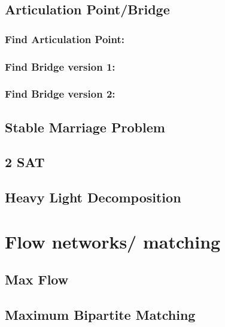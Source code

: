 \documentclass[11pt]{report}
\begin{document}
\section{Articulation Point/Bridge}
\subsection{Find Articulation Point:}

\subsection{Find Bridge version 1:}

\subsection{Find Bridge version 2:}

\section{Stable Marriage Problem}

\section{2 SAT}

\section{Heavy Light Decomposition}



\chapter{Flow networks/ matching}
\section{Max Flow}

\section{Maximum Bipartite Matching}

\end{document}
